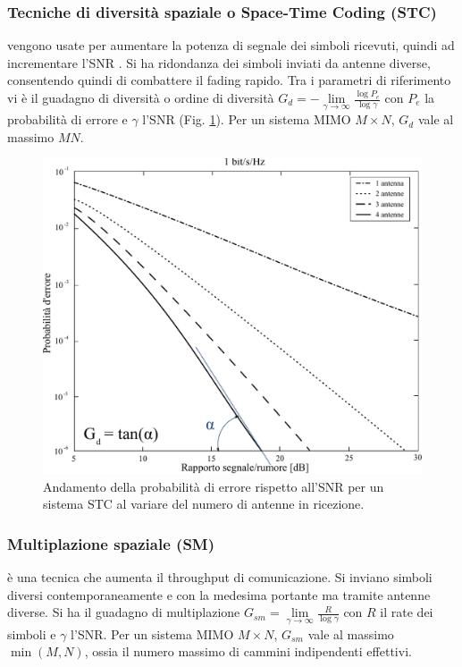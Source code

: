 \documentclass[technote]{IEEEtran}
\begin{document}
\subsubsection{Tecniche di diversità  spaziale o Space-Time Coding (STC)} vengono usate per aumentare la  potenza di segnale dei simboli ricevuti, quindi ad incrementare l'SNR \cite{SmartAntennas}. Si ha ridondanza dei simboli inviati da antenne diverse, consentendo quindi di combattere il {fading} rapido. Tra i parametri di riferimento vi è il guadagno di diversità o ordine di diversità ${G_d} =  - \mathop {\lim }\limits_{\gamma  \to \infty } \frac{{\log {P_e}}}{{\log \gamma }}$ con $P_e$ la probabilità  di errore e $\gamma$ l'SNR (Fig. \ref{fig:9}). Per un sistema MIMO $M \times N$, ${G_d}$ vale al massimo $MN$.
\begin{figure}[!h]
\centering
\includegraphics[width=0.95\columnwidth]{figure9}
\caption{Andamento della probabilità di errore rispetto all'SNR per un sistema STC al variare del numero di antenne in ricezione.}
\label{fig:9}
\end{figure}

\subsubsection{Multiplazione spaziale (SM)} è una tecnica che aumenta il {throughput} di comunicazione. Si inviano simboli diversi contemporaneamente e con la medesima portante ma tramite antenne diverse. Si ha il guadagno di multiplazione ${G_{sm}} = \mathop {\lim }\limits_{\gamma  \to \infty } \frac{R}{{\log \gamma }}$ con $R$ il rate dei simboli e $\gamma$ l'SNR. Per un sistema MIMO $M \times N$, ${G_{sm}}$ vale al massimo $\min (M,N)$, ossia il numero massimo di cammini indipendenti effettivi.
\end{document}
